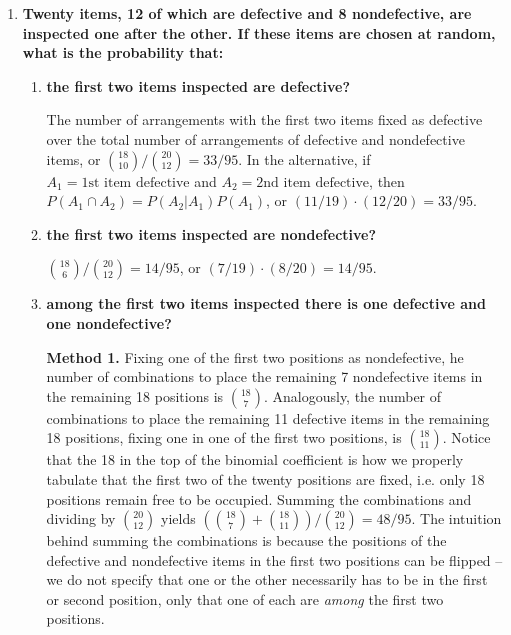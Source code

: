 \documentclass[10pt, oneside]{article}
\begin{document}
\begin{enumerate}[label=3.\arabic*]
\item  \begin{tcolorbox}[
  colback=Cerulean!5!white,
  colframe=Cerulean!75!black]
\textbf{Twenty items, 12 of which are defective and 8 nondefective, are inspected one after the other. If these items are chosen at random, what is the probability that:}
\end{tcolorbox}

	\begin{enumerate}

	\item  \begin{tcolorbox}[
	  colback=Cerulean!5!white,
	  colframe=Cerulean!75!black]
	\textbf{the first two items inspected are defective?}
	\end{tcolorbox}
	
	The number of arrangements with the first two items fixed as defective over the total number of arrangements of defective and nondefective items, or $\binom{18}{10} / \binom{20}{12} = \boxed{33/95}$. In the alternative, if $A_1 = \text{1st item defective}$ and $A_2 = \text{2nd item defective}$, then $P(A_1 \cap A_2) = P(A_2 | A_1) P(A_1)$, or $(11/19) \cdot (12/20) = \boxed{33/95}$.
	
	\item  \begin{tcolorbox}[
	  colback=Cerulean!5!white,
	  colframe=Cerulean!75!black]
	\textbf{the first two items inspected are nondefective?}
	\end{tcolorbox}
	
	$\binom{18}{6} / \binom{20}{12} = \boxed{14/95}$, or $(7/19) \cdot (8/20) = \boxed{14/95}$.
	
	\item  \begin{tcolorbox}[
	  colback=Cerulean!5!white,
	  colframe=Cerulean!75!black]
	\textbf{among the first two items inspected there is one defective and one nondefective?}
	\end{tcolorbox}
	
	\textbf{Method 1.} Fixing one of the first two positions as nondefective, he number of combinations to place the remaining 7 nondefective items in the remaining 18 positions is $\binom{18}{7}$. Analogously, the number of combinations to place the remaining 11 defective items in the remaining 18 positions, fixing one in one of the first two positions, is $\binom{18}{11}$. Notice that the 18 in the top of the binomial coefficient is how we properly tabulate that the first two of the twenty positions are fixed, i.e. only 18 positions remain free to be occupied. Summing the combinations and dividing by $\binom{20}{12}$ yields $( \binom{18}{7} + \binom{18}{11} ) / \binom{20}{12} = \boxed{48/95}$. The intuition behind summing the combinations is because the positions of the defective and nondefective items in the first two positions can be flipped -- we do not specify that one or the other necessarily has to be in the first or second position, only that one of each are \textit{among} the first two positions. 
	

\end{enumerate}
\end{enumerate}
\end{document}
